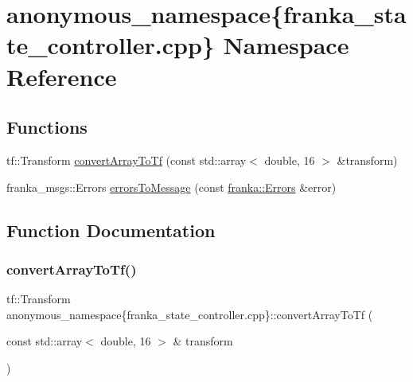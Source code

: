\hypertarget{namespaceanonymous__namespace_02franka__state__controller_8cpp_03}{}\section{anonymous\+\_\+namespace\{franka\+\_\+state\+\_\+controller.\+cpp\} Namespace Reference}
\label{namespaceanonymous__namespace_02franka__state__controller_8cpp_03}
\subsection*{Functions}
\begin{DoxyCompactItemize}
\item 
tf\+::\+Transform \hyperlink{namespaceanonymous__namespace_02franka__state__controller_8cpp_03_aca5abe1f63ce51c9ac407aa423c9a0cf}{convert\+Array\+To\+Tf} (const std\+::array$<$ double, 16 $>$ \&transform)
\item 
franka\+\_\+msgs\+::\+Errors \hyperlink{namespaceanonymous__namespace_02franka__state__controller_8cpp_03_a2ce17cf94c63412ee9586043b2ee3206}{errors\+To\+Message} (const \hyperlink{structfranka_1_1Errors}{franka\+::\+Errors} \&error)
\end{DoxyCompactItemize}


\subsection{Function Documentation}
\mbox{\label{namespaceanonymous__namespace_02franka__state__controller_8cpp_03_aca5abe1f63ce51c9ac407aa423c9a0cf}} 
\subsubsection{\texorpdfstring{convert\+Array\+To\+Tf()}{convertArrayToTf()}}
{\footnotesize\ttfamily tf\+::\+Transform anonymous\+\_\+namespace\{franka\+\_\+state\+\_\+controller.\+cpp\}\+::convert\+Array\+To\+Tf (\begin{DoxyParamCaption}\item[{const std\+::array$<$ double, 16 $>$ \&}]{transform }\end{DoxyParamCaption})}



